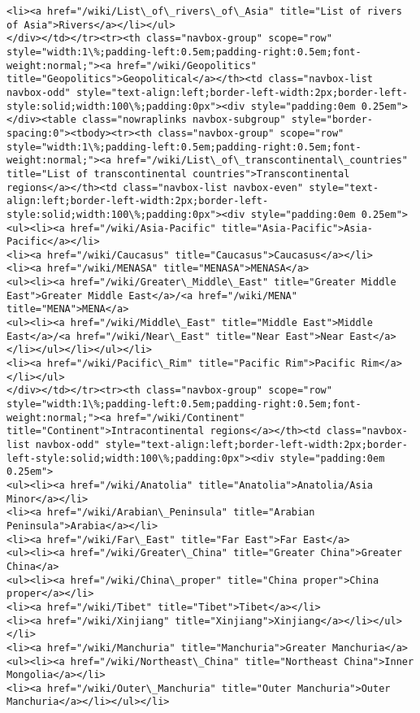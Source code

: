 \documentclass[11pt]{article}
\begin{document}
\begin{Verbatim}[commandchars=\\\{\}]
<li><a href="/wiki/List\_of\_rivers\_of\_Asia" title="List of rivers of Asia">Rivers</a></li></ul>
</div></td></tr><tr><th class="navbox-group" scope="row" style="width:1\%;padding-left:0.5em;padding-right:0.5em;font-weight:normal;"><a href="/wiki/Geopolitics" title="Geopolitics">Geopolitical</a></th><td class="navbox-list navbox-odd" style="text-align:left;border-left-width:2px;border-left-style:solid;width:100\%;padding:0px"><div style="padding:0em 0.25em"></div><table class="nowraplinks navbox-subgroup" style="border-spacing:0"><tbody><tr><th class="navbox-group" scope="row" style="width:1\%;padding-left:0.5em;padding-right:0.5em;font-weight:normal;"><a href="/wiki/List\_of\_transcontinental\_countries" title="List of transcontinental countries">Transcontinental regions</a></th><td class="navbox-list navbox-even" style="text-align:left;border-left-width:2px;border-left-style:solid;width:100\%;padding:0px"><div style="padding:0em 0.25em">
<ul><li><a href="/wiki/Asia-Pacific" title="Asia-Pacific">Asia-Pacific</a></li>
<li><a href="/wiki/Caucasus" title="Caucasus">Caucasus</a></li>
<li><a href="/wiki/MENASA" title="MENASA">MENASA</a>
<ul><li><a href="/wiki/Greater\_Middle\_East" title="Greater Middle East">Greater Middle East</a>/<a href="/wiki/MENA" title="MENA">MENA</a>
<ul><li><a href="/wiki/Middle\_East" title="Middle East">Middle East</a>/<a href="/wiki/Near\_East" title="Near East">Near East</a></li></ul></li></ul></li>
<li><a href="/wiki/Pacific\_Rim" title="Pacific Rim">Pacific Rim</a></li></ul>
</div></td></tr><tr><th class="navbox-group" scope="row" style="width:1\%;padding-left:0.5em;padding-right:0.5em;font-weight:normal;"><a href="/wiki/Continent" title="Continent">Intracontinental regions</a></th><td class="navbox-list navbox-odd" style="text-align:left;border-left-width:2px;border-left-style:solid;width:100\%;padding:0px"><div style="padding:0em 0.25em">
<ul><li><a href="/wiki/Anatolia" title="Anatolia">Anatolia/Asia Minor</a></li>
<li><a href="/wiki/Arabian\_Peninsula" title="Arabian Peninsula">Arabia</a></li>
<li><a href="/wiki/Far\_East" title="Far East">Far East</a>
<ul><li><a href="/wiki/Greater\_China" title="Greater China">Greater China</a>
<ul><li><a href="/wiki/China\_proper" title="China proper">China proper</a></li>
<li><a href="/wiki/Tibet" title="Tibet">Tibet</a></li>
<li><a href="/wiki/Xinjiang" title="Xinjiang">Xinjiang</a></li></ul></li>
<li><a href="/wiki/Manchuria" title="Manchuria">Greater Manchuria</a>
<ul><li><a href="/wiki/Northeast\_China" title="Northeast China">Inner Mongolia</a></li>
<li><a href="/wiki/Outer\_Manchuria" title="Outer Manchuria">Outer Manchuria</a></li></ul></li>

\end{Verbatim}
\end{document}
